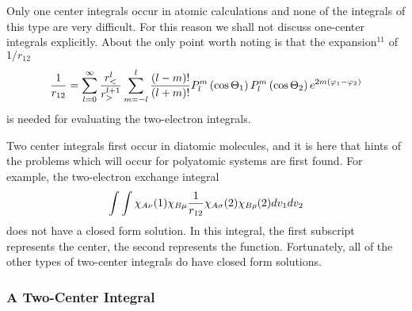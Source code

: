 Only one center integrals occur in atomic calculations and none of the
integrals of this type are very difficult.  For this reason we shall not 
discuss one-center integrals explicitly.  About the only point worth 
noting is that the expansion$^{11}$ of $1/r_{12}$
\begin{equation}
{1 \over r_{12}} = \sum^{\infty}_{l=0} {r^l_< \over r^{l+1}_>} 
\sum^{l}_{m=-l} {(l-m)! \over (l+m)!} P^m_l \left( \cos \Theta_1 
\right) P^m_l \left( \cos \Theta_2 \right) e^{2m(\varphi_1-\varphi_2)}
\end{equation}
is needed for evaluating the two-electron integrals.

Two center integrals first occur in diatomic molecules, and it is here
that hints of the problems which will occur for polyatomic systems are first
found. For example, the two-electron exchange integral
\begin{equation}
\int \int \chi_{A \nu} (1) \chi_{B \mu} {1 \over r_{12}} \chi_{A 
\sigma} (2) \chi_{B \rho} (2) dv_1 dv_2
\end{equation}
does not have a closed form solution.  In this integral, the first subscript
represents the center, the second represents the function.  Fortunately, all 
of the other types of two-center integrals do have closed form solutions.

\subsubsection{A Two-Center Integral}


